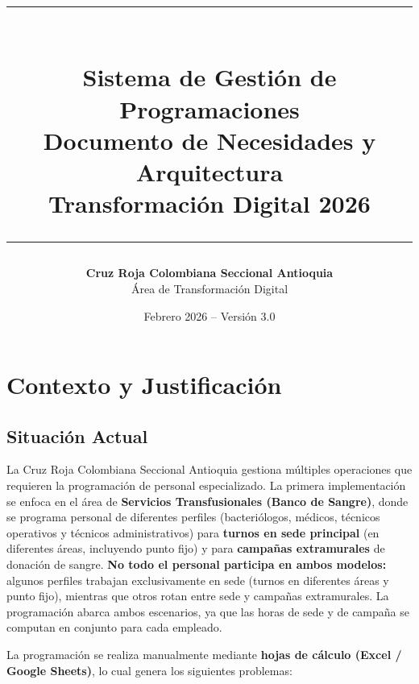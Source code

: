 \documentclass[10pt,a4paper]{article}
\title{
    \vspace{-1cm}
    {\color{azuloscuro}\rule{\textwidth}{2pt}}\\[0.8cm]
    {\Huge\bfseries\color{azuloscuro} Sistema de Gesti\'{o}n de\\[0.3cm] Programaciones}\\[0.5cm]
    {\Large\color{azulmedio} Documento de Necesidades y Arquitectura}\\[0.3cm]
    {\large\color{azulclaro} Transformaci\'{o}n Digital 2026}\\[0.5cm]
    {\color{azuloscuro}\rule{\textwidth}{2pt}}
}
\author{
    \textbf{Cruz Roja Colombiana Seccional Antioquia}\\
    \'{A}rea de Transformaci\'{o}n Digital
}
\date{Febrero 2026 -- Versi\'{o}n 3.0}
\begin{document}
\maketitle
\thispagestyle{empty}
\newpage

\tableofcontents
\newpage


\section{Contexto y Justificaci\'{o}n}

\subsection{Situaci\'{o}n Actual}

La Cruz Roja Colombiana Seccional Antioquia gestiona m\'{u}ltiples operaciones que requieren la programaci\'{o}n de personal especializado. La primera implementaci\'{o}n se enfoca en el \'{a}rea de \textbf{Servicios Transfusionales (Banco de Sangre)}, donde se programa personal de diferentes perfiles (bacteri\'{o}logos, m\'{e}dicos, t\'{e}cnicos operativos y t\'{e}cnicos administrativos) para \textbf{turnos en sede principal} (en diferentes \'{a}reas, incluyendo punto fijo) y para \textbf{campañas extramurales} de donaci\'{o}n de sangre. \textbf{No todo el personal participa en ambos modelos:} algunos perfiles trabajan exclusivamente en sede (turnos en diferentes \'{a}reas y punto fijo), mientras que otros rotan entre sede y campañas extramurales. La programaci\'{o}n abarca ambos escenarios, ya que las horas de sede y de campaña se computan en conjunto para cada empleado.

La programaci\'{o}n se realiza manualmente mediante \textbf{hojas de c\'{a}lculo (Excel / Google Sheets)}, lo cual genera los siguientes problemas:
\end{document}
